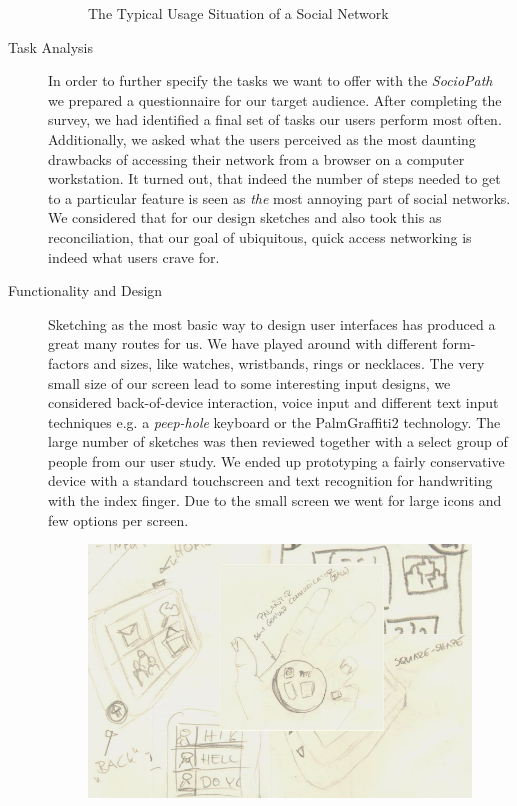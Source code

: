 \begin{description}
\begin{figure}[h]
\begin{center}
 \end{center}
 \caption{The Typical Usage Situation of a Social Network}
 \label{fig:context}
\end{figure}
  \item[Task Analysis]
    In order to further specify the tasks we want to offer with the \emph{SocioPath}
    we prepared a questionnaire for our target audience. After completing the 
    survey, we had identified a final set of tasks our users perform most often. 
    Additionally, we asked what the users perceived as the most daunting drawbacks
    of accessing their network from a browser on a computer workstation. It turned 
    out, that indeed the number of steps needed to get to a particular feature
    is seen as \emph{the} most annoying part of social networks. We considered 
    that for our design sketches and also took this as reconciliation, that our 
    goal of ubiquitous, quick access networking is indeed what users crave for.
  \item[Functionality and Design]
    Sketching as the most basic way to design user interfaces has produced 
    a great many routes for us. We have played around with different form-factors 
    and sizes, like watches, wristbands, rings or necklaces. The very small 
    size of our screen lead to some interesting input designs, we considered
    back-of-device interaction, voice input and different text input techniques
    e.g. a \emph{peep-hole} keyboard or the Palm\registered Graffiti2
    technology. The large number of sketches was then reviewed together with a 
    select group of people from our user study. We ended up prototyping a fairly 
    conservative device with a standard touchscreen and text recognition for 
    handwriting with the index finger. Due to the small screen we went for large 
    icons and few options per screen.
\begin{figure}[h]
  \begin{center}
    \includegraphics[width=1.0\linewidth]{imgs/sketches.png}

\end{center}
\end{figure}
\end{description}
